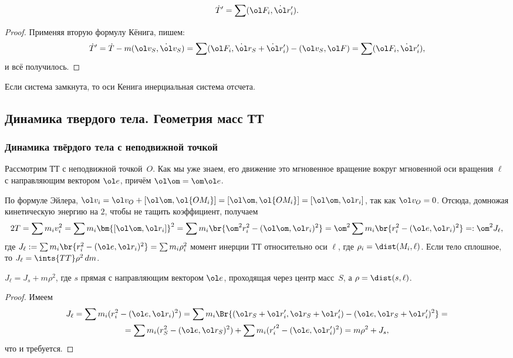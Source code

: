 \documentclass[a4paper,12pt]{article}
\def\F{\ol F}
\def\w{\ol\om}
\def\r{\ol r}
\def\v{\ol v}
\def\e{\ol e}
\def\d{\dot}
\begin{document}
\begin{theorem}
$$\d T'=\sum (\F_i,\d\r_i').$$
\end{theorem}
\begin{proof}
Применяя вторую формулу Кёнига, пишем:
$$\d T'=\d T-m(\v_S,\d\v_S)=\sum(\F_i,\d\r_S+\d\r'_i)-(\v_S,\F)=\sum (\F_i,\d\r'_i),$$
и всё получилось.
\end{proof}

Если система замкнута, то оси Кенига инерциальная система отсчета.

\subsection{Динамика твердого тела. Геометрия масс ТТ}

\subsubsection{Динамика твёрдого тела с неподвижной точкой}

Рассмотрим ТТ с неподвижной точкой~$O$. Как мы уже знаем, его движение это
мгновенное вращение вокруг мгновенной оси вращения $\ell$ с направляющим вектором $\e$,
причём $\w=\om\e$.

По формуле Эйлера, $\v_i=\v_O+[\w,\ol{OM_i}] = [\w,\ol{OM_i}] = [\w,\r_i]$, так как $\v_O = 0$.
Отсюда, домножая  кинетическую энергию на $2$, чтобы не тащить коэффициент, получаем
$$
2T=\sum m_iv_i^2=
\sum m_i \bm{[\w,\r_i]}^2=
\sum m_i \br{\om^2r_i^2-(\w,\r_i)^2}=
\om^2\sum m_i\br{r_i^2-(\e,\r_i)^2}=:
\om^2J_\ell,
$$
где $J_\ell:=\sum m_i\br{r_i^2-(\e,\r_i)^2}=\sum m_i\rho_i^2$ момент
инерции ТТ относительно оси $\ell$, где $\rho_i=\dist (M_i,\ell)$.
Если тело сплошное, то $J_\ell=\ints{TT}\rho^2\,dm$.

\begin{theorem}
$J_\ell=J_s+m\rho^2$, где $s$ прямая с направляющим вектором $\e$,
проходящая через центр масс~$S$, а $\rho=\dist(s,\ell)$.
\end{theorem}
\begin{proof}
Имеем
\begin{multline*}
J_\ell=
\sum m_i(r_i^2-(\e,\r_i)^2)=
\sum m_i\Br{(\r_S+\r'_i,\r_S+\r'_i)-(\e,\r_S+\r'_i)^2}=\\=
\sum m_i(r_S^2-(\e,\r_S)^2)+\sum m_i({r'_i}^2-(\e,\r'_i)^2)=m\rho^2+J_s,
\end{multline*}
что и требуется.
\end{proof}
\end{document}
